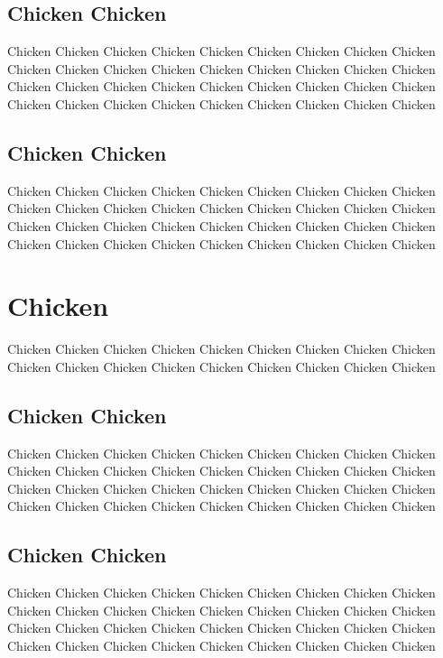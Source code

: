 \documentclass[11pt]{article} %
\begin{document}
\subsection{Chicken Chicken}

Chicken Chicken Chicken Chicken Chicken Chicken Chicken Chicken Chicken Chicken Chicken Chicken Chicken Chicken Chicken Chicken Chicken Chicken Chicken Chicken Chicken Chicken Chicken Chicken Chicken Chicken Chicken Chicken Chicken Chicken Chicken Chicken Chicken Chicken Chicken Chicken 

\subsection{Chicken Chicken}

Chicken Chicken Chicken Chicken Chicken Chicken Chicken Chicken Chicken Chicken Chicken Chicken Chicken Chicken Chicken Chicken Chicken Chicken Chicken Chicken Chicken Chicken Chicken Chicken Chicken Chicken Chicken Chicken Chicken Chicken Chicken Chicken Chicken Chicken Chicken Chicken

\section{Chicken}

Chicken Chicken Chicken Chicken Chicken Chicken Chicken Chicken Chicken Chicken Chicken Chicken Chicken Chicken Chicken Chicken Chicken Chicken 

\subsection{Chicken Chicken}

Chicken Chicken Chicken Chicken Chicken Chicken Chicken Chicken Chicken Chicken Chicken Chicken Chicken Chicken Chicken Chicken Chicken Chicken Chicken Chicken Chicken Chicken Chicken Chicken Chicken Chicken Chicken Chicken Chicken Chicken Chicken Chicken Chicken Chicken Chicken Chicken 

\subsection{Chicken Chicken}

Chicken Chicken Chicken Chicken Chicken Chicken Chicken Chicken Chicken Chicken Chicken Chicken Chicken Chicken Chicken Chicken Chicken Chicken Chicken Chicken Chicken Chicken Chicken Chicken Chicken Chicken Chicken Chicken Chicken Chicken Chicken Chicken Chicken Chicken Chicken Chicken 
\end{document}
